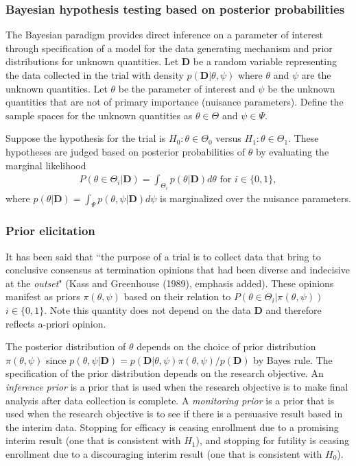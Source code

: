 \documentclass[12pt]{article}
\begin{document}
\subsubsection{Bayesian hypothesis testing based on posterior probabilities}

The Bayesian paradigm provides direct inference on a parameter of interest through specification of a model for the data generating mechanism and prior distributions for unknown quantities. Let $\mathbf{D}$ be a random variable representing the data collected in the trial with density $p(\mathbf{D}|\theta,\psi)$ where $\theta$ and $\psi$ are the unknown quantities. Let $\theta$ be the parameter of interest and $\psi$ be the unknown quantities that are not of primary importance (nuisance parameters). Define the sample spaces for the unknown quantities as $\theta\in\Theta$ and $\psi\in\Psi$. 

Suppose the hypothesis for the trial is $H_0:\theta\in\Theta_0$ versus $H_1:\theta\in\Theta_1$. These hypotheses are judged based on posterior probabilities of $\theta$ by evaluating the marginal likelihood 
\begin{align*}
P(\theta\in\Theta_i|\mathbf{D})=\int_{\Theta_i}p(\theta|\mathbf{D})d\theta\text{ for }i\in\{0,1\},
\end{align*}
where $p(\theta|\mathbf{D})=\int_{\Psi}p(\theta,\psi|\mathbf{D})d\psi$ is marginalized over the nuisance parameters.

\subsubsection{Prior elicitation}
It has been said that ``the purpose of a trial is to collect data that bring to conclusive consensus at termination opinions that had been diverse and indecisive at the \textit{outset}" (Kass and Greenhouse (1989), emphasis added). These opinions manifest as priors $\pi(\theta,\psi)$ based on their relation to $P(\theta\in\Theta_i|\pi(\theta,\psi))$ $i\in\{0,1\}$. Note this quantity does not depend on the data $\mathbf{D}$ and therefore reflects a-priori opinion.

The posterior distribution of $\theta$ depends on the choice of prior distribution $\pi(\theta,\psi)$ since $p(\theta,\psi|\mathbf{D})=p(\mathbf{D}|\theta,\psi)\pi(\theta,\psi)/p(\mathbf{D})$ by Bayes rule. The specification of the prior distribution depends on the research objective. An \textit{inference prior} is a prior that is used when the research objective is to make final analysis after data collection is complete. A \textit{monitoring prior} is a prior that is used when the research objective is to see if there is a persuasive result based in the interim data. Stopping for efficacy is ceasing enrollment due to a promising interim result (one that is consistent with $H_1$), and stopping for futility is ceasing enrollment due to a discouraging interim result (one that is consistent with $H_0$).
\end{document}
